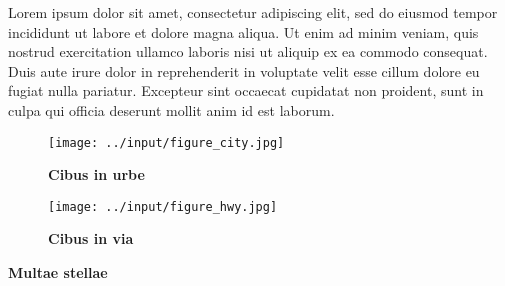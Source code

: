 \documentclass[12pt]{article}
\begin{document}
\begin{spacing}{1.4}
Lorem ipsum dolor sit amet, consectetur adipiscing elit, sed do eiusmod tempor incididunt ut labore et dolore magna aliqua. Ut enim ad minim veniam, quis nostrud exercitation ullamco laboris nisi ut aliquip ex ea commodo consequat. Duis aute irure dolor in reprehenderit in voluptate velit esse cillum dolore eu fugiat nulla pariatur. Excepteur sint occaecat cupidatat non proident, sunt in culpa qui officia deserunt mollit anim id est laborum.

\pagebreak{}



\pagebreak{}

\begin{figure}[!htp]
    \centering
    \caption{\bf{Cibus in urbe}}
    \label{fig:City}

    \texttt{[image: ../input/figure\_city.jpg]}

\end{figure}

\vspace{2cm}

\begin{figure}[!htp]
    \centering
    \caption{\bf{Cibus in via}}
    \label{fig:Hwy}

    \texttt{[image: ../input/figure\_hwy.jpg]}

\end{figure}

\pagebreak{}

\begin{table}[htp]
    \centering
    \caption{\bf{Multae stellae}}
    \label{tab:regression}
    
    
    
\end{table}


\end{spacing}
\end{document}
